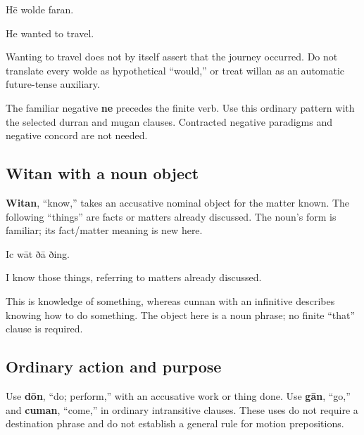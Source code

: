 Hē wolde faran.

He wanted to travel.

Wanting to travel does not by itself assert that the journey occurred. Do not translate every wolde as hypothetical “would,” or treat willan as an automatic future-tense auxiliary.

The familiar negative \textbf{ne} precedes the finite verb. Use this ordinary pattern with the selected durran and mugan clauses. Contracted negative paradigms and negative concord are not needed.

\subsection*{Witan with a noun object}

\textbf{Witan}, “know,” takes an accusative nominal object for the matter known. The following “things” are facts or matters already discussed. The noun’s form is familiar; its fact/\allowbreak{}matter meaning is new here.

Ic wāt ðā ðing.

I know those things, referring to matters already discussed.

This is knowledge of something, whereas cunnan with an infinitive describes knowing how to do something. The object here is a noun phrase; no finite “that” clause is required.

\subsection*{Ordinary action and purpose}

Use \textbf{dōn}, “do; perform,” with an accusative work or thing done. Use \textbf{gān}, “go,” and \textbf{cuman}, “come,” in ordinary intransitive clauses. These uses do not require a destination phrase and do not establish a general rule for motion prepositions.

